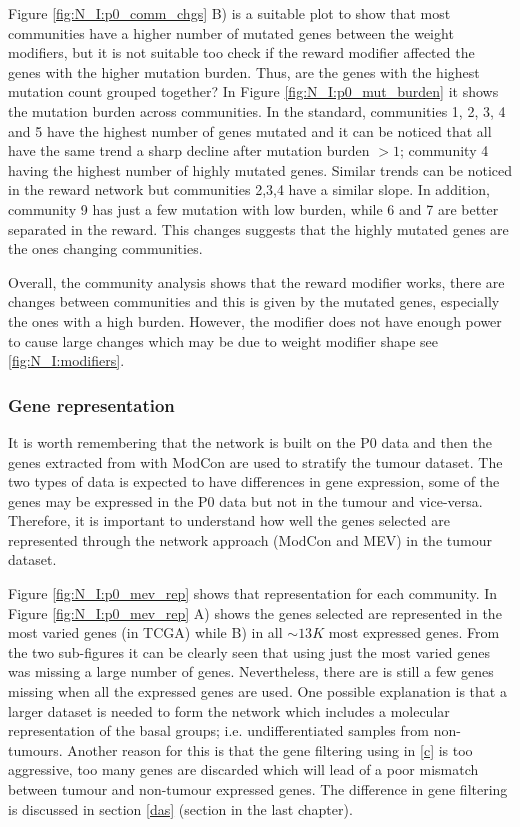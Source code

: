% 
Figure \ref{fig:N_I:p0_comm_chgs} B) is a suitable plot to show that most communities have a higher number of mutated genes between the weight modifiers, but it is not suitable too check if the reward modifier affected the genes with the higher mutation burden. Thus, are the genes with the highest mutation count grouped together? In Figure \ref{fig:N_I:p0_mut_burden} it shows the mutation burden across communities. In the standard, communities 1, 2, 3, 4 and 5 have the highest number of genes mutated and it can be noticed that all have the same trend a sharp decline after mutation burden $>1$; community 4 having the highest number of highly mutated genes. Similar trends can be noticed in the reward network but communities 2,3,4 have a similar slope. In addition, community 9 has just a few mutation with low burden, while 6 and 7 are better separated in the reward. This changes suggests that the highly mutated genes are the ones changing communities.


Overall, the community analysis shows that the reward modifier works, there are changes between communities and this is given by the mutated genes, especially the ones with a high burden. However, the modifier does not have enough power to cause large changes which may be due to weight modifier shape see \cref{fig:N_I:modifiers}.

\subsubsection{Gene representation}

It is worth remembering that the network is built on the P0 data and then the genes extracted from with ModCon are used to stratify the tumour dataset. The two types of data is expected to have differences in gene expression, some of the genes may be expressed in the P0 data but not in the tumour and vice-versa. Therefore, it is important to understand how well the genes selected are represented through the network approach (ModCon and MEV) in the tumour dataset. 


Figure \ref{fig:N_I:p0_mev_rep} shows that representation for each community. In Figure \ref{fig:N_I:p0_mev_rep} A) shows the genes selected are represented in the most varied genes (in TCGA) while B) in all $\sim13K$ most expressed genes. From the two sub-figures it can be clearly seen that using just the most varied genes was missing a large number of genes. Nevertheless, there are is still a few genes missing when all the expressed genes are used. One possible explanation is that a larger dataset is needed to form the network which includes a molecular representation of the basal groups; i.e. undifferentiated samples from non-tumours. Another reason for this is that the gene filtering using in \cref{c} is too aggressive, too many genes are discarded which will lead of a poor mismatch between tumour and non-tumour expressed genes. The difference in gene filtering is discussed in section \cref{das} (section in the last chapter).

